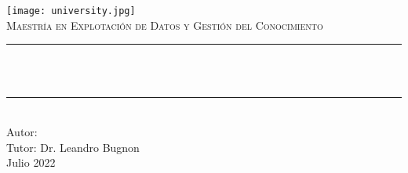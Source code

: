\begin{titlepage}

    \newcommand{\HRule}{\rule{\linewidth}{0.5mm}}

    \center
    \texttt{[image: university.jpg]}\\[1cm]

    \textsc{\Large Maestría en Explotación de Datos y Gestión del Conocimiento}\\[1.5cm]

    \makeatletter
    \HRule \\[0.6cm]
    {\huge \bfseries \@title}\\[0.4cm]
    \HRule \\[2cm]

    {\Large Autor: \@author}\\[1cm]
    {\Large Tutor: Dr. Leandro Bugnon}\\[3cm]

    {\large Julio 2022}\\[2cm]

    \vfill
\end{titlepage}
